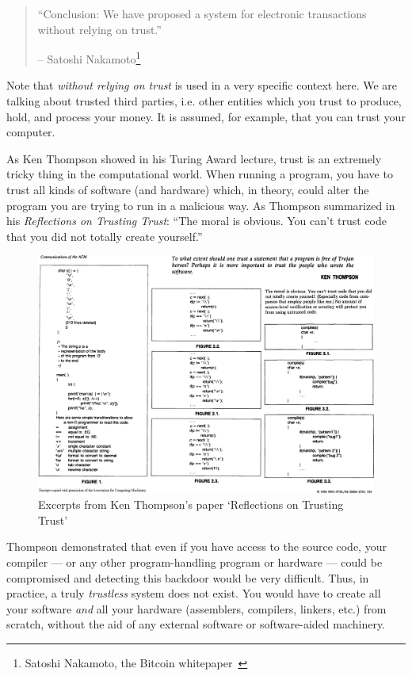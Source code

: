 \begin{quotation}\begin{samepage}
\enquote{Conclusion: We have proposed a system for electronic transactions
without relying on trust.}
\begin{flushright} -- Satoshi Nakamoto\footnote{Satoshi Nakamoto, the Bitcoin whitepaper~\cite{whitepaper}}
\end{flushright}\end{samepage}\end{quotation}

Note that \textit{without relying on trust} is used in a very specific context
here. We are talking about trusted third parties, i.e. other entities
which you trust to produce, hold, and process your money. It is assumed,
for example, that you can trust your computer.

As Ken Thompson showed in his Turing Award lecture, trust is an
extremely tricky thing in the computational world. When running a
program, you have to trust all kinds of software (and hardware) which,
in theory, could alter the program you are trying to run in a malicious
way. As Thompson summarized in his \textit{Reflections on Trusting Trust}:
\enquote{The moral is obvious. You can't trust code that you did not totally
create yourself.}~\cite{trusting-trust}

\begin{figure}
  \includegraphics{assets/images/ken-thompson-hack.png}
  \caption{Excerpts from Ken Thompson's paper `Reflections on Trusting Trust'}
  \label{fig:ken-thompson-hack}
\end{figure}

Thompson demonstrated that even if you have access to the source code,
your compiler --- or any other program-handling program or
hardware --- could be compromised and detecting this backdoor would be
very difficult. Thus, in practice, a truly \textit{trustless} system does not
exist. You would have to create all your software \textit{and} all your
hardware (assemblers, compilers, linkers, etc.) from scratch, without
the aid of any external software or software-aided machinery.

